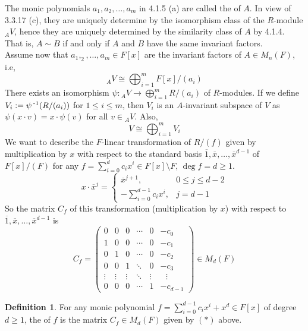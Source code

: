 \documentclass[11pt]{book}
\theoremstyle{definition}   \newtheorem{defn}[counter]{Definition} %
\newcommand{\ov}{\overline}   \newcommand{\wt}{\widetilde}
\newcommand{\bs}{\setminus}   \newcommand{\A}{\mathcal{A}}   \newcommand{\sy}{\textnormal{Syl}}   \newcommand{\size}[1]{\left| #1 \right|}
\newcommand{\mymatrix}[2]{\left( \begin{array}{#1} #2 \end{array} \right)}
\DeclareMathOperator{\ra}{\rightarrow}   \DeclareMathOperator{\Poly}{\mathbf{P}}   \DeclareMathOperator{\spn}{\textnormal{span}}   \DeclareMathOperator{\aut}{\textnormal{Aut}}
\newcommand{\vs}{\vspace{8pt}}   \newcommand{\hs}{\hspace{8pt}}
\numberwithin{counter}{chapter}
\begin{document}
\vs

\begin{remark}[+ Definition]
The monic polynomials $a_1,a_2,\dots,a_m$ in 4.1.5 (a) are called the  of $A$. In view of 3.3.17 (c), they are uniquely determine by the isomorphism class of the $R$-module $_AV$, hence they are uniquely determined by the similarity class of $A$ by 4.1.4. That is, $A \sim B$ if and only if $A$ and $B$ have the same invariant factors. \\

Assume now that $a_1,_2,\dots,a_m \in F[x]$ are the invariant factors of $A \in M_n(F)$, i.e,
	\[_AV \cong \bigoplus_{i=1}^m F[x]/(a_i) \]
There exists an isomorphism $\psi : {_AV} \ra \bigoplus_{i=1}^m R/(a_i)$ of $R$-modules. If we define $V_i := \psi\operatorname{^{-1}}(R/(a_i))$ for $1 \leq i \leq m$, then $V_i$ is an $A$-invariant subspace of $V$ as $\psi(x \cdot v) = x \cdot \psi(v)$ for all $v \in {_AV}$. Also,
	\[V \cong \bigoplus_{i=1}^m V_i \]
We want to describe the $F$-linear transformation of $R/(f)$ given by multiplication by $x$ with respect to the standard basis $\ov{1},\ov{x},\dots,\ov{x}^{d-1}$ of $F[x]/(F)$ for any $f = \sum_{i=0}^d c_i x^i \in F[x]\bs F$, $\deg f = d \geq 1$.
	\[x \cdot \ov{x}^j = \begin{cases}
	\ov{x}^{j+1}, \quad & 0 \leq j \leq d-2 \\
	-\sum_{i=0}^{d-1} c_i x^i, & j = d-1
	\end{cases} \]
So the matrix $C_f$ of this transformation (multiplication by $x$) with respect to $\ov{1},\ov{x},\dots,\ov{x}^{d-1}$ is
	\[C_f = \mymatrix{cccccl}{0 & 0 & 0 & \cdots & 0 & -c_0 \\
							  1 & 0 & 0 & \cdots & 0 & -c_1 \\
							  0 & 1 & 0 & \cdots & 0 & -c_2 \\
							  0 & 0 & 1 & \ddots & 0 & -c_3 \\
							  \vdots & \vdots & \vdots & \ddots & \vdots & \ \ \ \vdots \\
							  0 & 0 & 0 & \cdots & 1 & -c_{d-1}} \in M_d(F) \tag{$\ast$}\]
\end{remark}

\vs

\begin{defn}
For any monic polynomial $f = \sum_{i=0}^{d-1} c_i x^i + x^d \in F[x]$ of degree $d \geq 1$, the  of $f$ is the matrix $C_f \in M_d(F)$ given by $(\ast)$ above.
\end{defn}
\end{document}
